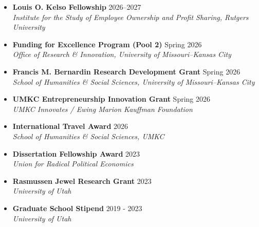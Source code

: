 \documentclass[letterpaper,11pt]{article}
\begin{document}
\begin{itemize}[leftmargin=0.15in, label={}]
\item \textbf{\color{primarycolor}Louis O. Kelso Fellowship} \hfill \textcolor{accentcolor}{2026--2027} \\
        \textit{\color{textgray}Institute for the Study of Employee Ownership and Profit Sharing, Rutgers University} \\[2pt]
\item \textbf{\color{primarycolor}Funding for Excellence Program (Pool 2)} \hfill \textcolor{accentcolor}{Spring 2026} \\
        \textit{\color{textgray}Office of Research \& Innovation, University of Missouri--Kansas City} \\[2pt]
  \item \textbf{\color{primarycolor}Francis M. Bernardin Research Development Grant} \hfill \textcolor{accentcolor}{Spring 2026} \\
        \textit{\color{textgray}School of Humanities \& Social Sciences, University of Missouri--Kansas City} \\[2pt]
  \item \textbf{\color{primarycolor}UMKC Entrepreneurship Innovation Grant} \hfill \textcolor{accentcolor}{Spring 2026} \\
        \textit{\color{textgray}UMKC Innovates / Ewing Marion Kauffman Foundation} \\[2pt]
  \item \textbf{\color{primarycolor}International Travel Award} \hfill \textcolor{accentcolor}{2026} \\
        \textit{\color{textgray}School of Humanities \& Social Sciences, UMKC} \\[2pt]
  \item \textbf{\color{primarycolor}Dissertation Fellowship Award} \hfill \textcolor{accentcolor}{2023} \\
        \textit{\color{textgray}Union for Radical Political Economics} \\[2pt]
  \item \textbf{\color{primarycolor}Rasmussen Jewel Research Grant} \hfill \textcolor{accentcolor}{2023} \\
        \textit{\color{textgray}University of Utah} \\[2pt]
  \item \textbf{\color{primarycolor}Graduate School Stipend} \hfill \textcolor{accentcolor}{2019 - 2023} \\
        \textit{\color{textgray}University of Utah} \\
\end{itemize}
\end{document}
